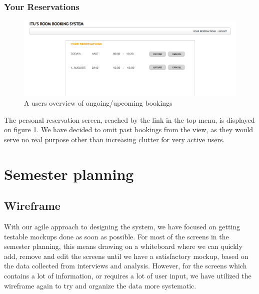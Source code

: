\subsubsection*{Your Reservations}
\begin{figure}[htb]
\begin{center}
\leavevmode
\includegraphics[width=1\textwidth]{images/reservations}
\end{center}
\caption{A users overview of ongoing/upcoming bookings}
\label{fig:reservations}
\end{figure}
The personal reservation screen, reached by the link in the top menu, is displayed on figure \ref{fig:reservations}. We have decided to omit past bookings from the view, as they would serve no real purpose other than increasing clutter for very active users.

\section{Semester planning}
\label{sec:semester_planning_ui}

\subsection{Wireframe}
\label{subsec:wire_sem}
With our agile approach to designing the system, we have focused on getting testable mockups done as soon as possible. For most of the screens in the semester planning, this means drawing on a whiteboard where we can quickly add, remove and edit the screens until we have a satisfactory mockup, based on the data collected from interviews and analysis. However, for the screens which contains a lot of information, or requires a lot of user input, we have utilized the wireframe again to try and organize the data more systematic.

